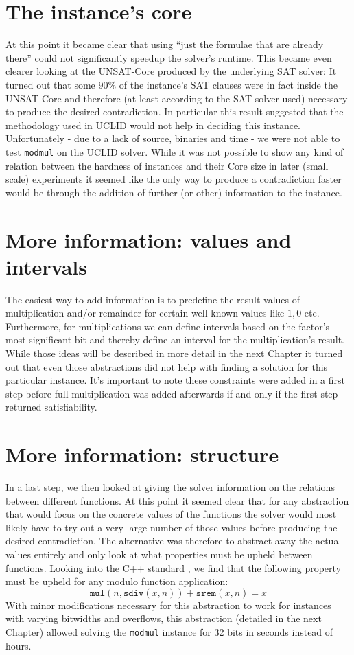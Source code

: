 \section{The instance's core}
At this point it became clear that using \enquote{just the formulae that are already there} could not significantly speedup the solver's runtime. This became even clearer looking at the UNSAT-Core produced by the underlying SAT solver: It turned out that some $90\%$ of the instance's SAT clauses were in fact inside the UNSAT-Core and therefore (at least according to the SAT solver used) necessary to produce the desired contradiction.
In particular this result suggested that the methodology used in UCLID \cite{Bryant2007_Chapter_DecidingBit-VectorArithmeticWi-UCLID} would not help in deciding this instance.
Unfortunately - due to a lack of source, binaries and time - we were not able to test \texttt{modmul} on the UCLID solver.
While it was not possible to show any kind of relation between the hardness of instances and their Core size in later (small scale) experiments it seemed like the only way to produce a contradiction faster would be through the addition of further (or other) information to the instance.

\section{More information: values and intervals}
The easiest way to add information is to predefine the result values of multiplication and/or remainder for certain well known values like $1,0$ etc. Furthermore, for multiplications we can define intervals based on the  factor's most significant bit and thereby define an interval for the multiplication's result. While those ideas will be described in more detail in the next Chapter it turned out that even those abstractions did not help with finding a solution for this particular instance. It's important to note these constraints were added in a first step before full multiplication was added afterwards if and only if the first step returned satisfiability.

\section{More information: structure}
In a last step, we then looked at giving the solver information on the relations between different functions. At this point it seemed clear that for any abstraction that would focus on the concrete values of the functions the solver would most likely have to try out a very large number of those values before producing the desired contradiction. The alternative was therefore to abstract away the actual values entirely and only look at what properties must be upheld between functions. Looking into the C++ standard \cite{ISO14882:2011}, we find that the following property must be upheld for any modulo function application:
\[
    \texttt{mul}\left( n, \texttt{sdiv}\left(x,n\right) \right) + \texttt{srem}\left(x,n\right) = x
\]
With minor modifications necessary for this abstraction to work for instances with varying bitwidths and overflows, this abstraction (detailed in the next Chapter) allowed solving the \texttt{modmul} instance for 32 bits in seconds instead of hours.


